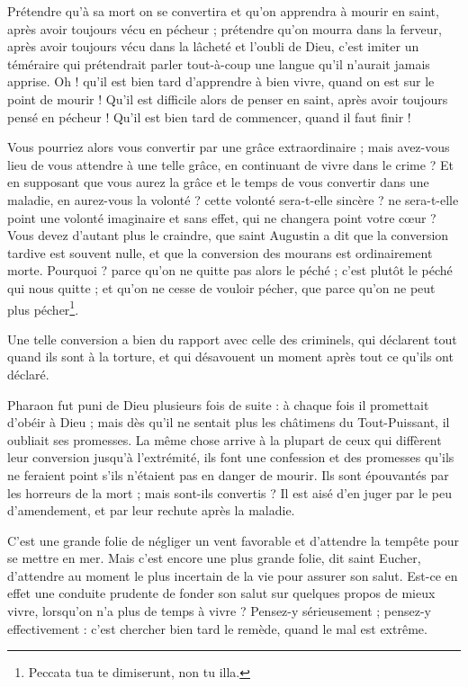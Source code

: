 \documentclass[instructions.tex]{subfiles}
\begin{document}
Prétendre qu’à sa mort on se convertira et qu’on apprendra à mourir en saint, après avoir toujours vécu en pécheur ; prétendre qu’on mourra dans la ferveur, après avoir toujours vécu dans la lâcheté et l’oubli de Dieu, c’est imiter un téméraire qui prétendrait parler tout-à-coup une langue qu’il n’aurait jamais apprise. Oh ! qu’il est bien tard d’apprendre à bien vivre, quand on est sur le point de mourir ! Qu’il est difficile alors de penser en saint, après avoir toujours pensé en pécheur ! Qu’il est bien tard de commencer, quand il faut finir !

\secundo Vous pourriez alors vous convertir par une grâce extraordinaire ; mais avez-vous lieu de vous attendre à une telle grâce, en continuant de vivre dans le crime ? Et en supposant que vous aurez la grâce et le temps de vous convertir dans une maladie, en aurez-vous la volonté ? cette volonté sera-t-elle sincère ? ne sera-t-elle point une volonté imaginaire et sans effet, qui ne changera point votre cœur ? Vous devez d’autant plus le craindre, que saint Augustin a dit que la conversion tardive est souvent nulle, et que la conversion des mourans est ordinairement morte. Pourquoi ? parce qu’on ne quitte pas alors le péché ; c’est plutôt le péché qui nous quitte ; et qu’on ne cesse de vouloir pécher, que parce qu’on ne peut plus pécher\footnote{Peccata tua te dimiserunt, non tu illa.}.

Une telle conversion a bien du rapport avec celle des criminels, qui déclarent tout quand ils sont à la torture, et qui désavouent un moment après tout ce qu’ils ont déclaré.

Pharaon fut puni de Dieu plusieurs fois de suite : à chaque fois il promettait d’obéir à Dieu ; mais dès qu’il ne sentait plus les châtimens du Tout-Puissant, il oubliait ses promesses. La même chose arrive à la plupart de ceux qui diffèrent leur conversion jusqu’à l’extrémité, ils font une confession et des promesses qu’ils ne feraient point s’ils n’étaient pas en danger de mourir. Ils sont épouvantés par les horreurs de la mort ; mais sont-ils convertis ? Il est aisé d’en juger par le peu d’amendement, et par leur rechute après la maladie.

C’est une grande folie de négliger un vent favorable et d’attendre la tempête pour se mettre en mer. Mais c’est encore une plus grande folie, dit saint Eucher, d’attendre au moment le plus incertain de la vie pour assurer son salut. Est-ce en effet une conduite prudente de fonder son salut sur quelques propos de mieux vivre, lorsqu’on n’a plus de temps à vivre ? Pensez-y sérieusement ; pensez-y effectivement : c’est chercher bien tard le remède, quand le mal est extrême.
\end{document}
